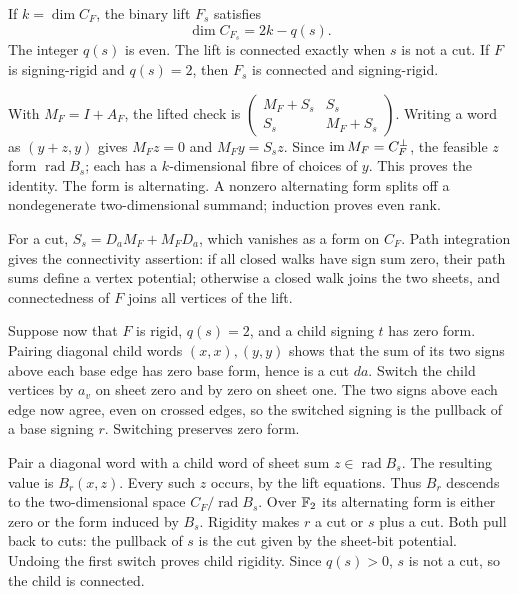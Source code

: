 \begin{lemma}\label{lem:binary-loss}
\notformalized
If $k=\dim C_F$, the binary lift $F_s$ satisfies
\[
 \dim C_{F_s}=2k-q(s).
\]
The integer $q(s)$ is even. The lift is connected exactly when $s$ is
not a cut. If $F$ is signing-rigid and $q(s)=2$, then $F_s$ is connected
and signing-rigid.
\end{lemma}
\begin{informalproof}
With $M_F=I+A_F$, the lifted check is
$\left(\begin{smallmatrix}M_F+S_s&S_s\\S_s&M_F+S_s\end{smallmatrix}\right)$.
Writing a word as $(y+z,y)$ gives $M_Fz=0$ and $M_Fy=S_sz$.
Since $\operatorname{im} M_F=C_F^\perp$, the feasible $z$ form $\operatorname{rad}B_s$;
each has a $k$-dimensional fibre of choices of $y$. This proves the
identity. The form is alternating. A nonzero alternating form splits
off a nondegenerate two-dimensional summand; induction proves even rank.

For a cut, $S_s=D_aM_F+M_FD_a$, which vanishes as a form on $C_F$.
Path integration gives the connectivity assertion: if all closed walks
have sign sum zero, their path sums define a vertex potential; otherwise
a closed walk joins the two sheets, and connectedness of $F$ joins all
vertices of the lift.

Suppose now that $F$ is rigid, $q(s)=2$, and a child signing $t$ has
zero form. Pairing diagonal child words $(x,x),(y,y)$ shows that the
sum of its two signs above each base edge has zero base form, hence is
a cut $da$. Switch the child vertices by $a_v$ on sheet zero and by
zero on sheet one. The two signs above each edge now agree, even on
crossed edges, so the switched signing is the pullback of a base
signing $r$. Switching preserves zero form.

Pair a diagonal word with a child word of sheet sum
$z\in\operatorname{rad}B_s$. The resulting value is $B_r(x,z)$.
Every such $z$ occurs, by the lift equations. Thus $B_r$ descends to
the two-dimensional space $C_F/\operatorname{rad}B_s$. Over $\mathbb{F}_2$ its
alternating form is either zero or the form induced by $B_s$.
Rigidity makes $r$ a cut or $s$ plus a cut. Both pull back to cuts:
the pullback of $s$ is the cut given by the sheet-bit potential.
Undoing the first switch proves child rigidity. Since $q(s)>0$, $s$
is not a cut, so the child is connected.
\end{informalproof}

